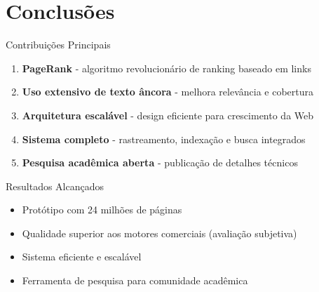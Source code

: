 \documentclass[aspectratio=169]{beamer}
\begin{document}
\section{Conclusões}

\begin{frame}{Contribuições Principais}
\begin{enumerate}
\item \textbf{PageRank} - algoritmo revolucionário de ranking baseado em links
\item \textbf{Uso extensivo de texto âncora} - melhora relevância e cobertura
\item \textbf{Arquitetura escalável} - design eficiente para crescimento da Web
\item \textbf{Sistema completo} - rastreamento, indexação e busca integrados
\item \textbf{Pesquisa acadêmica aberta} - publicação de detalhes técnicos
\end{enumerate}

\vspace{0.5cm}
\begin{block}{Resultados Alcançados}
\begin{itemize}
\item Protótipo com 24 milhões de páginas
\item Qualidade superior aos motores comerciais (avaliação subjetiva)
\item Sistema eficiente e escalável
\item Ferramenta de pesquisa para comunidade acadêmica
\end{itemize}
\end{block}
\end{frame}
\end{document}
